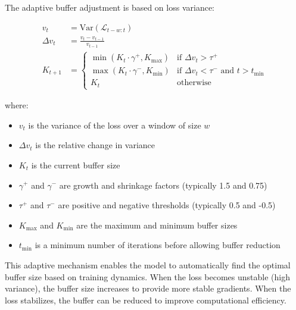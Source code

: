 \begin{equationbox}[title=Adaptive MoCo Buffer Adjustment]
  The adaptive buffer adjustment is based on loss variance:

  \begin{align}
    v_t &= \text{Var}(\mathcal{L}_{t-w:t})\\
    \Delta v_t &= \frac{v_t - v_{t-1}}{v_{t-1}}\\
    K_{t+1} &= \begin{cases}
      \min(K_t \cdot \gamma^+, K_{\max}) & \text{if } \Delta v_t > \tau^+\\
      \max(K_t \cdot \gamma^-, K_{\min}) & \text{if } \Delta v_t < \tau^- \text{ and } t > t_{\min}\\
      K_t & \text{otherwise}
    \end{cases}
  \end{align}

  where:
  \begin{itemize}
  \item $v_t$ is the variance of the loss over a window of size $w$
  \item $\Delta v_t$ is the relative change in variance
  \item $K_t$ is the current buffer size
  \item $\gamma^+$ and $\gamma^-$ are growth and shrinkage factors (typically 1.5 and 0.75)
  \item $\tau^+$ and $\tau^-$ are positive and negative thresholds (typically 0.5 and -0.5)
  \item $K_{\max}$ and $K_{\min}$ are the maximum and minimum buffer sizes
  \item $t_{\min}$ is a minimum number of iterations before allowing buffer reduction
  \end{itemize}
\end{equationbox}

This adaptive mechanism enables the model to automatically find the optimal buffer size based on training dynamics. When the loss becomes unstable (high variance), the buffer size increases to provide more stable gradients. When the loss stabilizes, the buffer can be reduced to improve computational efficiency.

